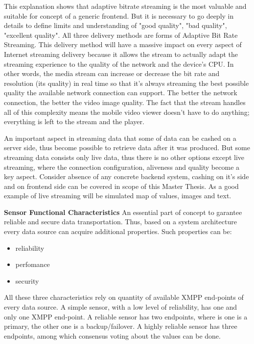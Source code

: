   \newline
  This explanation shows that adaptive bitrate streaming is the most valuable and suitable for concept of a generic frontend.
  But it is necessary to go deeply in details to define limits and understanding of "good quality", "bad quality", "excellent quality".
  All three delivery methods are forms of Adaptive Bit Rate Streaming. This delivery method will have a massive impact on every aspect of Internet streaming delivery because it allows the stream to actually adapt the streaming experience to the quality of the network and the device's CPU.
  \newline
  In other words, the media stream can increase or decrease the bit rate and resolution (its quality) in real time so that it’s always streaming the best possible quality the available network connection can support. The better the network connection, the better the video image quality. The fact that the stream handles all of this complexity means the mobile video viewer doesn’t have to do anything; everything is left to the stream and the player.

  An important aspect in streaming data that some of data can be cashed on a server side, thus become possible to retrieve data after it was produced. But some streaming data consists only live data, thus there is no other options except live streaming, where the connection configuration, aliveness and quality become a key aspect. Consider absence of any concrete backend system, cashing on it's side and on frontend side can be covered in scope of this Master Thesis. As a good example of live streaming will be simulated map of values, images and text.

  \textbf{Sensor Functional Characteristics}
  An essential part of concept to garantee reliable and secure data transportation. Thus, based on a system architecture every data source can acquire additional properties. Such properties can be:
  \begin{itemize}
  \item reliability
  \item perfomance
  \item security
  \end{itemize}
  All these three characteristics rely on quantity of available XMPP end-points of every data source. A simple sensor, with a low level of reliability, has one and only one XMPP end-point. A reliable sensor has two endpoints, where is one is a primary, the other one is a backup/failover. A highly reliable sensor has three endpoints, among which consensus voting about the values can be done. 

